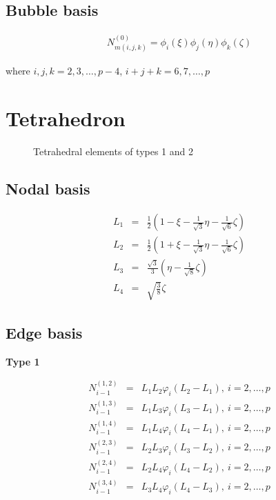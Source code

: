 \subsection{Bubble basis}

\begin{eqnarray*}
N_{m(i,j,k)}^{(0)}=\phi_i(\xi)\phi_j(\eta)\phi_k(\zeta)
\end{eqnarray*}

\noindent where $i,j,k=2,3,\ldots,p-4$, $i+j+k=6,7,\ldots,p$

\section{Tetrahedron}

\begin{figure}[tbhp]
\begin{minipage}{.5\textwidth}
\begin{center}

\end{center}
\end{minipage}
\begin{minipage}{.5\textwidth}
\begin{center}

\end{center}
\end{minipage}
\caption{Tetrahedral elements of types 1 and 2}
\end{figure}

\subsection{Nodal basis}

\begin{eqnarray*}
L_1&=&\frac{1}{2}(1-\xi-\frac{1}
{\sqrt{3}}\eta-\frac{1}{\sqrt{6}}\zeta) \\
L_2&=&\frac{1}{2}(1+\xi-\frac{1}
{\sqrt{3}}\eta-\frac{1}{\sqrt{6}}\zeta) \\
L_3&=&\frac{\sqrt{3}}{3}(\eta-\frac{1}{\sqrt{8}}\zeta) \\
L_4&=&\sqrt{\frac{3}{8}}\zeta
\end{eqnarray*}

\subsection{Edge basis}

\noindent \textbf{Type 1}

\begin{eqnarray*}
N_{i-1}^{(1,2)}&=&L_1L_2\varphi_i(L_2-L_1),\ i=2,\ldots,p \\
N_{i-1}^{(1,3)}&=&L_1L_3\varphi_i(L_3-L_1),\ i=2,\ldots,p \\
N_{i-1}^{(1,4)}&=&L_1L_4\varphi_i(L_4-L_1),\ i=2,\ldots,p \\
N_{i-1}^{(2,3)}&=&L_2L_3\varphi_i(L_3-L_2),\ i=2,\ldots,p \\
N_{i-1}^{(2,4)}&=&L_2L_4\varphi_i(L_4-L_2),\ i=2,\ldots,p \\
N_{i-1}^{(3,4)}&=&L_3L_4\varphi_i(L_4-L_3),\ i=2,\ldots,p 
\end{eqnarray*}

